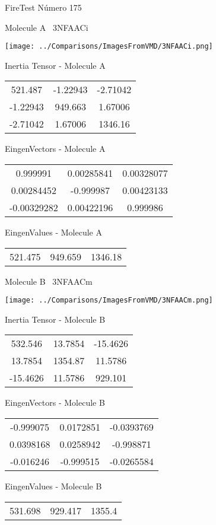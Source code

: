 \vtab[-3cm]
\begin{center}
{\large FireTest \tab Número 175}
\end{center}
\begin{multicols}{2}
\begin{center}

Molecule A \
3NFAACi

\texttt{[image: ../Comparisons/ImagesFromVMD/3NFAACi.png]}

Inertia Tensor - Molecule A \\
\begin{tabular}{|c c c|}
521.487	 & 	-1.22943	 & 	-2.71042	 \\
-1.22943	 & 	949.663	 & 	1.67006	 \\
-2.71042	 & 	1.67006	 & 	1346.16
\end{tabular}

\vtab
 EingenVectors - Molecule A     \\
\begin{tabular}{|c c c|}
0.999991	 & 	0.00285841	 & 	0.00328077	 \\
0.00284452	 & 	-0.999987	 & 	0.00423133	 \\
-0.00329282	 & 	0.00422196	 & 	0.999986
\end{tabular}

\vtab
 EingenValues - Molecule A     \\
\begin{tabular}{|c c c|}
521.475	 & 	949.659	 & 	1346.18	 \\
\end{tabular}
\columnbreak

Molecule B \
3NFAACm

\texttt{[image: ../Comparisons/ImagesFromVMD/3NFAACm.png]}

Inertia Tensor - Molecule B \\
\begin{tabular}{|c c c|}
532.546	 & 	13.7854	 & 	-15.4626	 \\
13.7854	 & 	1354.87	 & 	11.5786	 \\
-15.4626	 & 	11.5786	 & 	929.101
\end{tabular}

\vtab
 EingenVectors - Molecule B     \\
\begin{tabular}{|c c c|}
-0.999075	 & 	0.0172851	 & 	-0.0393769	 \\
0.0398168	 & 	0.0258942	 & 	-0.998871	 \\
-0.016246	 & 	-0.999515	 & 	-0.0265584
\end{tabular}

\vtab
 EingenValues - Molecule B     \\
\begin{tabular}{|c c c|}
531.698	 & 	929.417	 & 	1355.4	 \\
\end{tabular}

\end{center}
\end{multicols}

